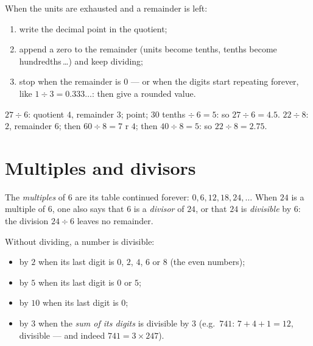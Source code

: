 \begin{method}\label{met:g5:division:continue}
When the units are exhausted and a remainder is left:
\begin{enumerate}
  \item write the decimal point in the quotient;
  \item append a zero to the remainder (units become tenths, tenths
        become hundredths\,\dots) and keep dividing;
  \item stop when the remainder is $0$ --- or when the digits start
        repeating forever, like $1 \div 3 = 0.333\dots$: then give a
        rounded value.
\end{enumerate}
\end{method}

\begin{example}\label{ex:g5:division:continue}
$27 \div 6$: quotient $4$, remainder $3$; point; $30$ tenths
$\div\ 6 = 5$: so $27 \div 6 = 4.5$. \quad
$22 \div 8$: $2$, remainder $6$; then $60 \div 8 = 7$ r $4$;
then $40 \div 8 = 5$: so $22 \div 8 = 2.75$.
\end{example}

\section{Multiples and divisors}

\begin{definition}\label{def:g5:division:multiple}
The \emph{multiples} of $6$ are its table continued
forever: $0, 6, 12, 18, 24, \dots$ When $24$ is a multiple of $6$,
one also says that $6$ is a \emph{divisor} of $24$,
or that $24$ is \emph{divisible} by $6$: the division
$24 \div 6$ leaves no remainder.
\end{definition}

\begin{proposition}\label{prop:g5:division:criteria}
Without dividing, a number is divisible:
\begin{itemize}
  \item by $2$ when its last digit is $0$, $2$, $4$, $6$ or $8$
        (the even numbers);
  \item by $5$ when its last digit is $0$ or $5$;
  \item by $10$ when its last digit is $0$;
  \item by $3$ when the \emph{sum of its digits} is divisible by
        $3$ (e.g.\ $741$: $7 + 4 + 1 = 12$, divisible --- and indeed
        $741 = 3 \times 247$).
\end{itemize}
\end{proposition}
\admitted

